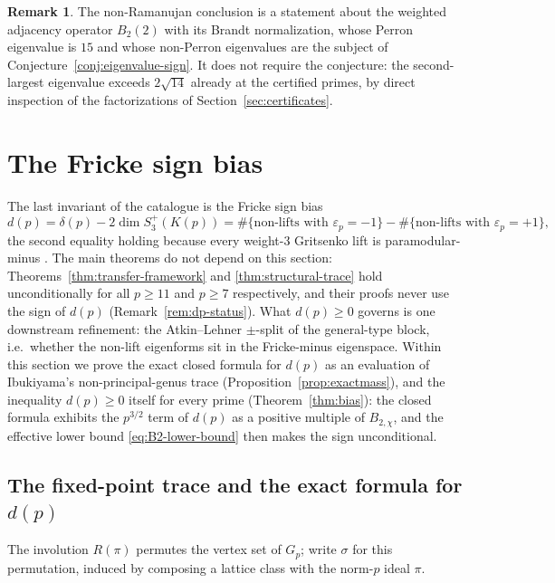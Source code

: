\documentclass[11pt]{amsart}
\theoremstyle{plain}
\theoremstyle{definition}
\newtheorem{remark}[theorem]{Remark}
\newcommand{\eps}{\varepsilon}
\begin{document}
	\begin{remark}\label{rem:nonramanujan}
		The non-Ramanujan conclusion is a statement about the weighted adjacency
		operator $B_2(2)$ with its Brandt normalization, whose Perron eigenvalue
		is $15$ and whose non-Perron eigenvalues are the subject of
		Conjecture~\ref{conj:eigenvalue-sign}. It does not require the conjecture:
		the second-largest eigenvalue exceeds $2\sqrt{14}$ already at the
		certified primes, by direct inspection of the factorizations of
		Section~\ref{sec:certificates}.
	\end{remark}
	
	\section{The Fricke sign bias}
	\label{sec:signbias}
	
	The last invariant of the catalogue is the Fricke sign bias
	\begin{equation}\label{eq:dp-def}
		d(p)=\delta(p)-2\dim S_3^+(K(p))
		=\#\{\text{non-lifts with }\eps_p=-1\}
		-\#\{\text{non-lifts with }\eps_p=+1\},
	\end{equation}
	the second equality holding because every weight-$3$ Gritsenko lift \cite{Gritsenko1995} is
	paramodular-minus \cite{IPY2013}. The main theorems do not depend on this
	section: Theorems~\ref{thm:transfer-framework} and
	\ref{thm:structural-trace} hold unconditionally for all $p\ge11$ and
	$p\ge7$ respectively, and their proofs never use the sign of
	$d(p)$ (Remark~\ref{rem:dp-status}). What $d(p)\ge0$ governs is one
	downstream refinement: the Atkin--Lehner $\pm$-split of the general-type
	block, i.e.\ whether the non-lift eigenforms sit in the Fricke-minus
	eigenspace. Within this section we prove the exact closed formula for $d(p)$ as an
	evaluation of Ibukiyama's non-principal-genus trace (Proposition~\ref{prop:exactmass}), and
	the inequality $d(p)\ge0$ itself for every prime (Theorem~\ref{thm:bias}): the closed
	formula exhibits the $p^{3/2}$ term of $d(p)$ as a positive multiple of
	$B_{2,\chi}$, and the effective lower bound \eqref{eq:B2-lower-bound} then
	makes the sign unconditional.
	
	\subsection{The fixed-point trace and the exact formula for $d(p)$}
	\label{ss:mass}
	
	The involution $R(\pi)$ permutes the vertex set of $G_p$; write $\sigma$
	for this permutation, induced by composing a lattice class with the
	norm-$p$ ideal $\pi$.
	
\end{document}
